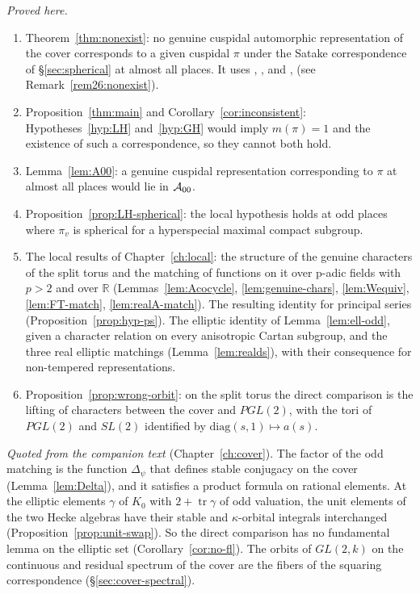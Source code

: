 \documentclass[12pt,letterpaper,openany]{book}
\theoremstyle{plain}
\theoremstyle{definition}
\theoremstyle{remark}
\theoremstyle{remark}
\newcommand{\tr}{\operatorname{tr}}
\begin{document}
\emph{Proved here.}
\begin{enumerate}
\item Theorem~\ref{thm:nonexist}: no genuine cuspidal automorphic
representation of the cover corresponds to a given cuspidal $\pi$ under
the Satake correspondence of \S\ref{sec:spherical} at almost all places.
It uses \cite{LL}, \cite{GJ78}, \cite{JS} and \cite{Wa1}, \cite{Wa2} (see
Remark~\ref{rem26:nonexist}).
\item Proposition~\ref{thm:main} and Corollary~\ref{cor:inconsistent}:
Hypotheses~\ref{hyp:LH} and~\ref{hyp:GH} would imply $m(\pi)=1$ and the
existence of such a correspondence, so they cannot both hold.
\item Lemma~\ref{lem:A00}: a genuine cuspidal representation corresponding
to $\pi$ at almost all places would lie in ${\cal A}_{00}$.
\item Proposition~\ref{prop:LH-spherical}: the local hypothesis holds at
odd places where $\pi_v$ is spherical for a hyperspecial maximal compact
subgroup.
\item The local results of Chapter~\ref{ch:local}: the structure of the
genuine characters of the split torus and the matching of functions on it
over p-adic fields with $p>2$ and over ${\mathbb R}$
(Lemmas~\ref{lem:Acocycle}, \ref{lem:genuine-chars}, \ref{lem:Wequiv},
\ref{lem:FT-match}, \ref{lem:realA-match}). The resulting identity for
principal series (Proposition~\ref{prop:hyp-ps}). The elliptic identity of
Lemma~\ref{lem:ell-odd}, given a character relation on every anisotropic
Cartan subgroup, and the three real elliptic matchings
(Lemma~\ref{lem:realds}), with their consequence for non-tempered
representations.
\item Proposition~\ref{prop:wrong-orbit}: on the split torus the direct
comparison is the lifting of characters between the cover and $PGL(2)$,
with the tori of $PGL(2)$ and $SL(2)$ identified by
$\mathrm{diag}(s,1)\mapsto a(s)$.
\end{enumerate}

\emph{Quoted from the companion text \cite{JC}}
(Chapter~\ref{ch:cover}). The factor of the odd matching is the function
$\Delta_\psi$ that defines stable conjugacy on the cover
(Lemma~\ref{lem:Delta}), and it satisfies a product formula on rational
elements. At the elliptic elements $\gamma$ of $K_0$ with $2+\tr\gamma$
of odd valuation, the unit elements of the two Hecke algebras have their
stable and $\kappa$-orbital integrals interchanged
(Proposition~\ref{prop:unit-swap}). So the direct comparison has no
fundamental lemma on the elliptic set (Corollary~\ref{cor:no-fl}). The
orbits of $GL(2,k)$ on the continuous and residual spectrum of the cover
are the fibers of the squaring correspondence
(\S\ref{sec:cover-spectral}).
\end{document}
